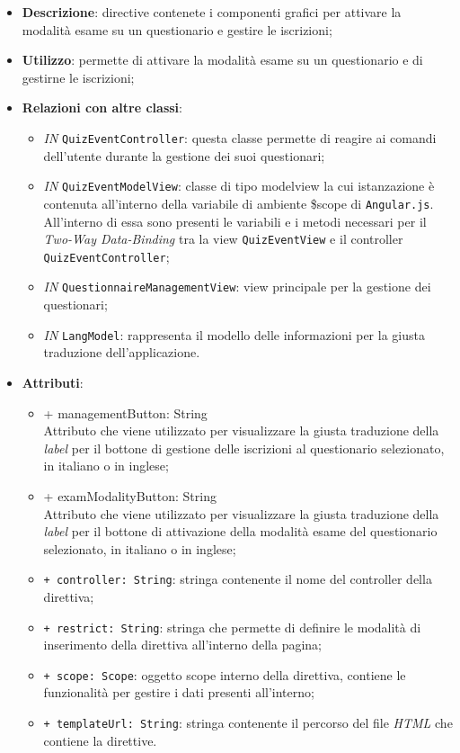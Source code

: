 \begin{itemize}
	\item \textbf{Descrizione}: directive contenete i componenti grafici per attivare la modalità esame su un questionario e gestire le iscrizioni;
	\item \textbf{Utilizzo}: permette di attivare la modalità esame su un questionario e di gestirne le iscrizioni;
	\item \textbf{Relazioni con altre classi}:
	\begin{itemize}
		\item \textit{IN} \texttt{QuizEventController}: questa classe permette di reagire ai comandi dell'utente durante la gestione dei suoi questionari;
		\item \textit{IN} \texttt{QuizEventModelView}: classe di tipo modelview la cui istanzazione è contenuta all'interno della variabile di ambiente \$scope di \texttt{Angular.js}. All'interno di essa sono presenti le variabili e i metodi necessari per il \textit{Two-Way Data-Binding} tra la view \texttt{QuizEventView} e il controller \texttt{QuizEventController};
		\item \textit{IN} \texttt{QuestionnaireManagementView}: view principale per la gestione dei questionari; 
		\item \textit{IN} \texttt{LangModel}: rappresenta il modello delle informazioni per la giusta traduzione dell'applicazione.
	\end{itemize}
		\item \textbf{Attributi}:
		\begin{itemize}
			\item {+ managementButton: String} \\ Attributo che viene utilizzato per visualizzare la giusta traduzione della \textit{label} per il bottone di gestione delle iscrizioni al questionario selezionato, in italiano o in inglese; 
			\item {+ examModalityButton: String} \\ Attributo che viene utilizzato per visualizzare la giusta traduzione della \textit{label} per il bottone di attivazione della modalità esame del questionario selezionato, in italiano o in inglese;
			\item \texttt{+ controller: String}: stringa contenente il nome del controller della direttiva;
			\item \texttt{+ restrict: String}: stringa che permette di definire le modalità di inserimento della direttiva all'interno della pagina;
			\item \texttt{+ scope: Scope}: oggetto scope interno della direttiva, contiene le funzionalità per gestire i dati presenti all'interno;
			\item \texttt{+ templateUrl: String}: stringa contenente il percorso del file \textit{HTML} che contiene la direttive.
		\end{itemize}
\end{itemize}

